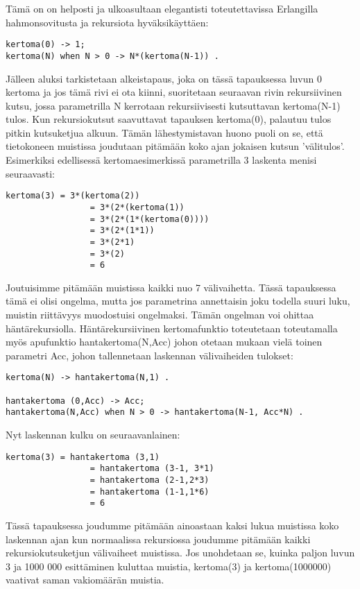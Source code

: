 \documentclass[11pt,oneside,a4paper]{article}
\begin{document}
Tämä on on helposti ja ulkoasultaan elegantisti toteutettavissa Erlangilla
hahmonsovitusta ja rekursiota hyväksikäyttäen:
\begin{verbatim}
kertoma(0) -> 1;
kertoma(N) when N > 0 -> N*(kertoma(N-1)) .
\end{verbatim}
Jälleen aluksi tarkistetaan alkeistapaus, joka on tässä tapauksessa luvun 0
kertoma ja jos tämä rivi ei ota kiinni, suoritetaan seuraavan rivin
rekursiivinen kutsu, jossa parametrilla N kerrotaan rekursiivisesti kutsuttavan
kertoma(N-1) tulos.
Kun rekursiokutsut saavuttavat tapauksen kertoma(0), palautuu tulos pitkin
kutsuketjua alkuun. Tämän lähestymistavan huono puoli on se, että tietokoneen
muistissa joudutaan pitämään koko ajan jokaisen kutsun 'välitulos'. Esimerkiksi
edellisessä 
kertomaesimerkissä parametrilla 3 laskenta menisi seuraavasti:
\begin{verbatim}
kertoma(3) = 3*(kertoma(2))
                 = 3*(2*(kertoma(1))
                 = 3*(2*(1*(kertoma(0))))
                 = 3*(2*(1*1))
                 = 3*(2*1)
                 = 3*(2)
                 = 6
\end{verbatim}
Joutuisimme pitämään muistissa kaikki nuo 7 välivaihetta. Tässä tapauksessa tämä
ei olisi ongelma, mutta jos parametrina annettaisin joku todella suuri luku,
muistin riittävyys muodostuisi ongelmaksi. 
Tämän ongelman voi ohittaa häntärekursiolla. Häntärekursiivinen kertomafunktio
toteutetaan toteutamalla myös apufunktio hantakertoma(N,Acc) johon otetaan
mukaan vielä toinen parametri Acc, johon tallennetaan laskennan 
välivaiheiden tulokset:
\begin{verbatim}
kertoma(N) -> hantakertoma(N,1) .

hantakertoma (0,Acc) -> Acc;
hantakertoma(N,Acc) when N > 0 -> hantakertoma(N-1, Acc*N) .
\end{verbatim}

Nyt laskennan kulku on seuraavanlainen: 
\begin{verbatim}
kertoma(3) = hantakertoma (3,1)
                 = hantakertoma (3-1, 3*1)		
                 = hantakertoma (2-1,2*3)
                 = hantakertoma (1-1,1*6)
                 = 6
\end{verbatim}
Tässä tapauksessa joudumme pitämään ainoastaan kaksi lukua muistissa koko
laskennan ajan kun normaalissa rekursiossa joudumme pitämään kaikki
rekursiokutsuketjun välivaiheet muistissa. Jos unohdetaan se, kuinka paljon
luvun 3 ja 1000 000 esittäminen kuluttaa muistia, kertoma(3) ja kertoma(1000000)
vaativat saman vakiomäärän muistia. 
\end{document}
